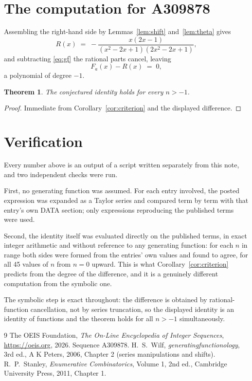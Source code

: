 \documentclass[11pt,a4paper]{article}
\theoremstyle{plain}
\newtheorem{theorem}{Theorem}
\theoremstyle{definition}
\begin{document}
\section{The computation for A309878}

Assembling the right-hand side by Lemmas~\ref{lem:shift} and~\ref{lem:theta} gives
\[
R(x)\;=\;- \frac{x \left(2 x - 1\right)}{\left(x^{2} - 2 x + 1\right) \left(2 x^{2} - 2 x + 1\right)} ,
\]
and subtracting \eqref{eq:gf} the rational parts cancel, leaving
\[
F_{a}(x)-R(x)\;=\;0 ,
\]
a polynomial of degree $-1$.

\begin{theorem}
The conjectured identity holds for every $n>-1$.
\end{theorem}

\begin{proof}
Immediate from Corollary~\ref{cor:criterion} and the displayed difference.
\end{proof}

\section{Verification}

Every number above is an output of a script written separately from this note, and two
independent checks were run.

First, no generating function was assumed. For each entry involved, the posted expression
was expanded as a Taylor series and compared term by term with that entry's own DATA
section; only expressions reproducing the published terms were used.

Second, the identity itself was evaluated directly on the published terms, in exact
integer arithmetic and without reference to any generating function: for each $n$ in range
both sides were formed from the entries' own values and found to agree, for all 45
values of $n$ from $n=0$ upward. This is what Corollary~\ref{cor:criterion}
predicts from the degree of the difference, and it is a genuinely different computation
from the symbolic one.

The symbolic step is exact throughout: the difference is obtained by rational-function
cancellation, not by series truncation, so the displayed identity is an identity of
functions and the theorem holds for all $n>-1$ simultaneously.

\begin{thebibliography}{9}
 The OEIS Foundation, \emph{The On-Line Encyclopedia of Integer Sequences},
\url{https://oeis.org}, 2026. Sequence A309878.
 H.~S.~Wilf, \emph{generatingfunctionology}, 3rd ed., A K Peters, 2006,
Chapter 2 (series manipulations and shifts).
 R.~P.~Stanley, \emph{Enumerative Combinatorics}, Volume 1, 2nd ed.,
Cambridge University Press, 2011, Chapter 1.
\end{thebibliography}
\end{document}
